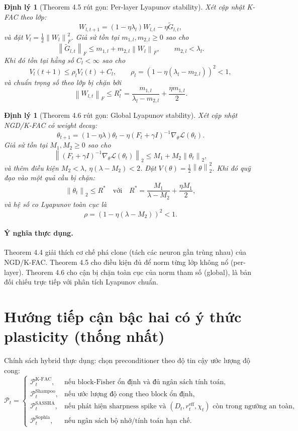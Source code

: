 \documentclass[11pt]{article}
\newcommand{\norm}[1]{\left\lVert #1 \right\rVert}
\newtheorem{theorem}[lemma]{Định lý}
\begin{document}
\begin{theorem}[Theorem 4.5 rút gọn: Per-layer Lyapunov stability]
Xét cập nhật K-FAC theo lớp:
\[
W_{l,t+1}=(1-\eta\lambda_l)W_{l,t}-\eta\tilde G_{l,t},
\]
và đặt $V_l=\frac12\norm{W_l}_F^2$. Giả sử tồn tại $m_{1,l},m_{2,l}\ge0$ sao cho
\[
\norm{\tilde G_{l,t}}_F \le m_{1,l}+m_{2,l}\norm{W_l}_F,\qquad m_{2,l}<\lambda_l.
\]
Khi đó tồn tại hằng số $C_l<\infty$ sao cho
\[
V_l(t+1)\le \rho_l V_l(t)+C_l,\qquad
\rho_l=(1-\eta(\lambda_l-m_{2,l}))^2<1,
\]
và chuẩn trọng số theo lớp bị chặn bởi
\[
\norm{W_{l,t}}_F \le R_l^*=\frac{m_{1,l}}{\lambda_l-m_{2,l}}+\frac{\eta m_{1,l}}{2}.
\]
\end{theorem}

\begin{theorem}[Theorem 4.6 rút gọn: Global Lyapunov stability]
Xét cập nhật NGD/K-FAC có weight decay:
\[
\theta_{t+1}
=
(1-\eta\lambda)\theta_t
-\eta(F_t+\gamma I)^{-1}\nabla_\theta\mathcal{L}(\theta_t).
\]
Giả sử tồn tại $M_1,M_2\ge0$ sao cho
\[
\norm{(F_t+\gamma I)^{-1}\nabla_\theta\mathcal{L}(\theta_t)}_2
\le
M_1+M_2\norm{\theta_t}_2,
\]
và thêm điều kiện $M_2<\lambda$, $\eta(\lambda-M_2)<2$.
Đặt $V(\theta)=\frac12\norm{\theta}_2^2$. Khi đó quỹ đạo vào một quả cầu bị chặn:
\[
\norm{\theta_t}_2 \le R^*
\quad\text{với}\quad
R^*=\frac{M_1}{\lambda-M_2}+\frac{\eta M_1}{2},
\]
và hệ số co Lyapunov toàn cục là
\[
\rho=(1-\eta(\lambda-M_2))^2<1.
\]
\end{theorem}

\paragraph{Ý nghĩa thực dụng.}
Theorem 4.4 giải thích cơ chế phá clone (tách các neuron gần trùng nhau) của NGD/K-FAC.
Theorem 4.5 cho điều kiện đủ để norm từng lớp không nổ (per-layer).
Theorem 4.6 cho cận bị chặn toàn cục của norm tham số (global), là bản đối chiếu trực tiếp với phân tích Lyapunov chuẩn.

\section{Hướng tiếp cận bậc hai có ý thức plasticity (thống nhất)}
Chính sách hybrid thực dụng: chọn preconditioner theo độ tin cậy ước lượng độ cong:
\begin{equation}
\mathcal{P}_t =
\begin{cases}
\mathcal{P}^{\mathrm{K\text{-}FAC}}_t, & \text{nếu block-Fisher ổn định và đủ ngân sách tính toán},\\
\mathcal{P}^{\mathrm{Shampoo}}_t, & \text{nếu ước lượng độ cong theo block ổn định},\\
\mathcal{P}^{\mathrm{SASSHA}}_t, & \text{nếu phát hiện sharpness spike và }(D_t,r_t^{\mathrm{eff}},\chi_t)\text{ còn trong ngưỡng an toàn},\\
\mathcal{P}^{\mathrm{Sophia}}_t, & \text{nếu ngân sách bộ nhớ/tính toán hạn chế}.
\end{cases}
\label{eq:switch_rule}
\end{equation}
\end{document}
